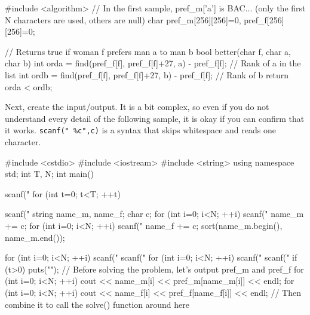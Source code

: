\begin{cbox}
#include <algorithm>
// In the first sample, pref\_m['a'] is BAC... (only the first N characters are used, others are null)
char pref_m[256][256]={{0}}, pref_f[256][256]={{0}};

// Returns true if woman f prefers man a to man b
bool better(char f, char a, char b) {
  int orda = find(pref_f[f], pref_f[f]+27, a) - pref_f[f]; // Rank of a in the list
  int ordb = find(pref_f[f], pref_f[f]+27, b) - pref_f[f]; // Rank of b
  return orda < ordb;
}
\end{cbox}

Next, create the input/output. It is a bit complex, so even if you do not understand every detail of the following sample, it is okay if you can confirm that it works. \texttt{scanf(" \%c",c)} is a syntax that skips whitespace and reads one character.

\begin{cbox}
#include <cstdio>
#include <iostream>
#include <string>
using namespace std;
int T, N;
int main() {
    scanf("%
    for (int t=0; t<T; ++t) {
        scanf("%
        string name_m, name_f;
        char c;
        for (int i=0; i<N; ++i) {
            scanf(" %
            name_m += c;
        }
        for (int i=0; i<N; ++i) {
            scanf(" %
            name_f += c;
        }
        sort(name_m.begin(), name_m.end());
        
        for (int i=0; i<N; ++i) {
            scanf(" %
            scanf(" %
        }
        for (int i=0; i<N; ++i) {
            scanf(" %
            scanf(" %
        }
        if (t>0) puts("");
        // Before solving the problem, let's output pref\_m and pref\_f
        for (int i=0; i<N; ++i)
            cout << name\_m[i] << pref\_m[name\_m[i]] << endl;
        for (int i=0; i<N; ++i)
            cout << name\_f[i] << pref\_f[name\_f[i]] << endl;
        // Then combine it to call the solve() function around here
    }
}
\end{cbox}

